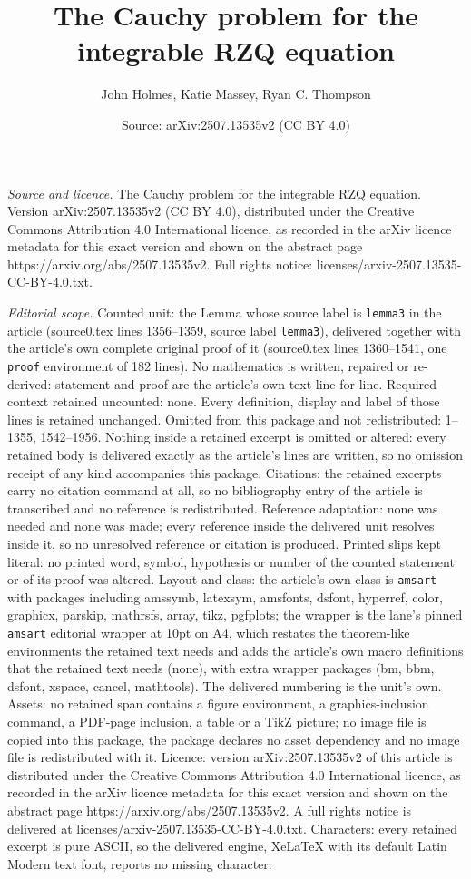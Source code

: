 \documentclass[10pt,a4paper]{amsart}
\title[The Cauchy problem for the integrable RZQ equation]{The Cauchy problem for the integrable RZQ equation}
\author{John Holmes, Katie Massey, Ryan C. Thompson}
\date{Source: arXiv:2507.13535v2 (CC BY 4.0)}
\begin{document}
\maketitle

\noindent\emph{Source and licence.} The Cauchy problem for the integrable RZQ equation. Version arXiv:2507.13535v2 (CC BY 4.0), distributed under the Creative Commons Attribution 4.0 International licence, as recorded in the arXiv licence metadata for this exact version and shown on the abstract page https://arxiv.org/abs/2507.13535v2. Full rights notice: licenses/arxiv-2507.13535-CC-BY-4.0.txt.\par\smallskip

\noindent\textit{Editorial scope.} Counted unit: the Lemma whose source label is \texttt{lemma3} in the article (source0.tex lines 1356--1359, source label \texttt{lemma3}), delivered together with the article's own complete original proof of it (source0.tex lines 1360--1541, one \texttt{proof} environment of 182 lines). No mathematics is written, repaired or re-derived: statement and proof are the article's own text line for line. Required context retained uncounted: none. Every definition, display and label of those lines is retained unchanged. Omitted from this package and not redistributed: 1--1355, 1542--1956. Nothing inside a retained excerpt is omitted or altered: every retained body is delivered exactly as the article's lines are written, so no omission receipt of any kind accompanies this package. Citations: the retained excerpts carry no citation command at all, so no bibliography entry of the article is transcribed and no reference is redistributed. Reference adaptation: none was needed and none was made; every reference inside the delivered unit resolves inside it, so no unresolved reference or citation is produced. Printed slips kept literal: no printed word, symbol, hypothesis or number of the counted statement or of its proof was altered. Layout and class: the article's own class is \texttt{amsart} with packages including amssymb, latexsym, amsfonts, dsfont, hyperref, color, graphicx, parskip, mathrsfs, array, tikz, pgfplots; the wrapper is the lane's pinned \texttt{amsart} editorial wrapper at 10pt on A4, which restates the theorem-like environments the retained text needs and adds the article's own macro definitions that the retained text needs (none), with extra wrapper packages (bm, bbm, dsfont, xspace, cancel, mathtools). The delivered numbering is the unit's own. Assets: no retained span contains a figure environment, a graphics-inclusion command, a PDF-page inclusion, a table or a TikZ picture; no image file is copied into this package, the package declares no asset dependency and no image file is redistributed with it. Licence: version arXiv:2507.13535v2 of this article is distributed under the Creative Commons Attribution 4.0 International licence, as recorded in the arXiv licence metadata for this exact version and shown on the abstract page https://arxiv.org/abs/2507.13535v2. A full rights notice is delivered at licenses/arxiv-2507.13535-CC-BY-4.0.txt. Characters: every retained excerpt is pure ASCII, so the delivered engine, XeLaTeX with its default Latin Modern text font, reports no missing character.
\end{document}
